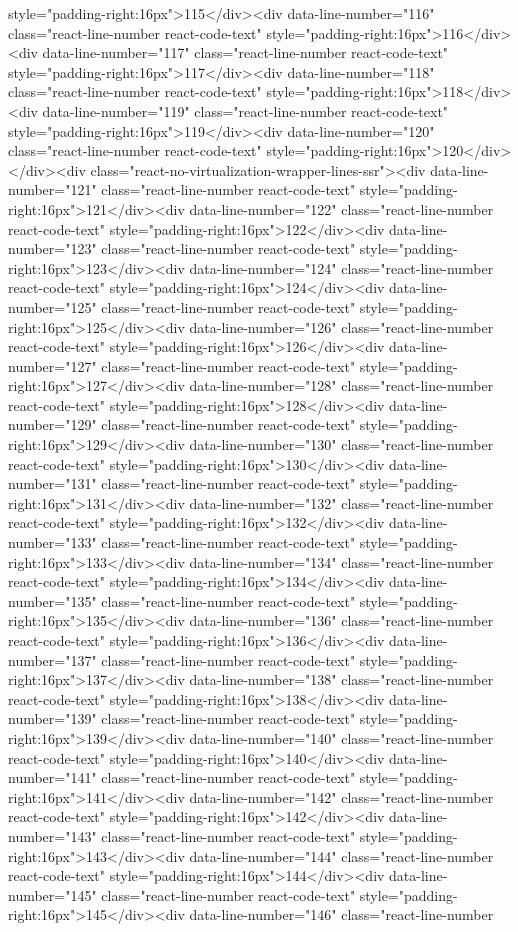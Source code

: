 {{{{{style="padding-right:16px">115</div><div data-line-number="116" class="react-line-number react-code-text" style="padding-right:16px">116</div><div data-line-number="117" class="react-line-number react-code-text" style="padding-right:16px">117</div><div data-line-number="118" class="react-line-number react-code-text" style="padding-right:16px">118</div><div data-line-number="119" class="react-line-number react-code-text" style="padding-right:16px">119</div><div data-line-number="120" class="react-line-number react-code-text" style="padding-right:16px">120</div></div><div class="react-no-virtualization-wrapper-lines-ssr"><div data-line-number="121" class="react-line-number react-code-text" style="padding-right:16px">121</div><div data-line-number="122" class="react-line-number react-code-text" style="padding-right:16px">122</div><div data-line-number="123" class="react-line-number react-code-text" style="padding-right:16px">123</div><div data-line-number="124" class="react-line-number react-code-text" style="padding-right:16px">124</div><div data-line-number="125" class="react-line-number react-code-text" style="padding-right:16px">125</div><div data-line-number="126" class="react-line-number react-code-text" style="padding-right:16px">126</div><div data-line-number="127" class="react-line-number react-code-text" style="padding-right:16px">127</div><div data-line-number="128" class="react-line-number react-code-text" style="padding-right:16px">128</div><div data-line-number="129" class="react-line-number react-code-text" style="padding-right:16px">129</div><div data-line-number="130" class="react-line-number react-code-text" style="padding-right:16px">130</div><div data-line-number="131" class="react-line-number react-code-text" style="padding-right:16px">131</div><div data-line-number="132" class="react-line-number react-code-text" style="padding-right:16px">132</div><div data-line-number="133" class="react-line-number react-code-text" style="padding-right:16px">133</div><div data-line-number="134" class="react-line-number react-code-text" style="padding-right:16px">134</div><div data-line-number="135" class="react-line-number react-code-text" style="padding-right:16px">135</div><div data-line-number="136" class="react-line-number react-code-text" style="padding-right:16px">136</div><div data-line-number="137" class="react-line-number react-code-text" style="padding-right:16px">137</div><div data-line-number="138" class="react-line-number react-code-text" style="padding-right:16px">138</div><div data-line-number="139" class="react-line-number react-code-text" style="padding-right:16px">139</div><div data-line-number="140" class="react-line-number react-code-text" style="padding-right:16px">140</div><div data-line-number="141" class="react-line-number react-code-text" style="padding-right:16px">141</div><div data-line-number="142" class="react-line-number react-code-text" style="padding-right:16px">142</div><div data-line-number="143" class="react-line-number react-code-text" style="padding-right:16px">143</div><div data-line-number="144" class="react-line-number react-code-text" style="padding-right:16px">144</div><div data-line-number="145" class="react-line-number react-code-text" style="padding-right:16px">145</div><div data-line-number="146" class="react-line-number }}}}}
